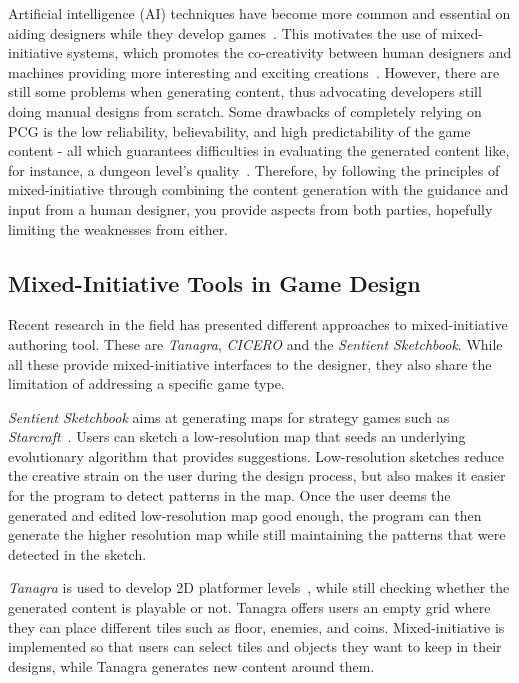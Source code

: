 \documentclass[sigconf]{acmart}
\begin{document}
Artificial intelligence (AI) techniques have become more common and essential on aiding designers while they develop games~\cite{togeliuspanorama}. This motivates the use of mixed-initiative systems, which promotes the co-creativity between human designers and machines providing more interesting and exciting creations~\cite{yannakakis_mixed-initiative_2014}. However, there are still some problems when generating content, thus advocating developers still doing manual designs from scratch. Some drawbacks of completely relying on PCG is the low reliability, believability, and high predictability of the game content - all which guarantees difficulties in evaluating the generated content like, for instance, a dungeon level's quality~\cite{karavolos_mixed-initiative_2015}. Therefore, by following the principles of mixed-initiative through combining the content generation with the guidance and input from a human designer, you provide aspects from both parties, hopefully limiting the weaknesses from either.  

\subsection{Mixed-Initiative Tools in Game Design}

Recent research in the field has presented different approaches to mixed-initiative authoring tool. These are \emph{Tanagra}, \emph{CICERO} and the \emph{Sentient Sketchbook}. While all these provide mixed-initiative interfaces to the designer, they also share the limitation of addressing a specific game type. 

\emph{Sentient Sketchbook} aims at generating maps for strategy games such as \emph{Starcraft}~\cite{liapis_sentient_2013}. Users can sketch a low-resolution map that seeds an underlying evolutionary algorithm that provides suggestions. Low-resolution sketches reduce the creative strain on the user during the design process, but also makes it easier for the program to detect patterns in the map. Once the user deems the generated and edited low-resolution map good enough, the program can then generate the higher resolution map while still maintaining the patterns that were detected in the sketch. 

\emph{Tanagra} is used to develop 2D platformer levels~\cite{Tanagra2011}, while still checking whether the generated content is playable or not. Tanagra offers users an empty grid where they can place different tiles such as floor, enemies, and coins. Mixed-initiative is implemented so that users can select tiles and objects they want to keep in their designs, while Tanagra generates new content around them. 
\end{document}
